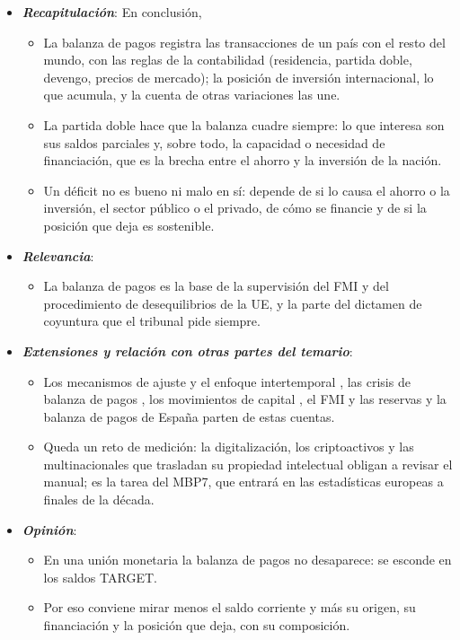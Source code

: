 \documentclass[11pt]{article}
\begin{document}
\begin{itemize}
\item \textbf{\emph{Recapitulación}}: En conclusión,
  \begin{itemize}
  \item La balanza de pagos registra las transacciones de un país con el resto del mundo, con las reglas de la contabilidad (residencia, partida doble, devengo, precios de mercado); la posición de inversión internacional, lo que acumula, y la cuenta de otras variaciones las une.
  \item La partida doble hace que la balanza cuadre siempre: lo que interesa son sus saldos parciales y, sobre todo, la capacidad o necesidad de financiación, que es la brecha entre el ahorro y la inversión de la nación.
  \item Un déficit no es bueno ni malo en sí: depende de si lo causa el ahorro o la inversión, el sector público o el privado, de cómo se financie y de si la posición que deja es sostenible.
  \end{itemize}
\item \textbf{\emph{Relevancia}}:
  \begin{itemize}
  \item La balanza de pagos es la base de la supervisión del FMI y del procedimiento de desequilibrios de la UE, y la parte del dictamen de coyuntura que el tribunal pide siempre.
  \end{itemize}
\item \textbf{\emph{Extensiones y relación con otras partes del temario}}:
  \begin{itemize}
  \item Los mecanismos de ajuste y el enfoque intertemporal , las crisis de balanza de pagos , los movimientos de capital , el FMI y las reservas  y la balanza de pagos de España  parten de estas cuentas.
  \item Queda un reto de medición: la digitalización, los criptoactivos y las multinacionales que trasladan su propiedad intelectual obligan a revisar el manual; es la tarea del MBP7, que entrará en las estadísticas europeas a finales de la década.
  \end{itemize}
\item \textbf{\emph{Opinión}}:
  \begin{itemize}
  \item En una unión monetaria la balanza de pagos no desaparece: se esconde en los saldos TARGET.
  \item Por eso conviene mirar menos el saldo corriente y más su origen, su financiación y la posición que deja, con su composición.

\end{itemize}
\end{itemize}
\end{document}
